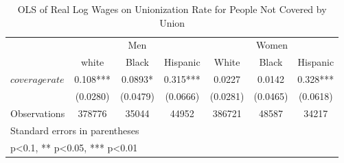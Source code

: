 \begin{table}[htbp]\centering
\def\sym#1{\ifmmode^{#1}\else\(^{#1}\)\fi}
\caption{OLS of Real Log Wages on Unionization Rate for People Not Covered by Union}
\begin{tabular}{l*{6}{c}}
\hline\hline
                    &\multicolumn{3}{c}{Men}                        &\multicolumn{3}{c}{Women}                      \\\cmidrule(lr){2-4}\cmidrule(lr){5-7}
                    &\multicolumn{1}{c}{white}&\multicolumn{1}{c}{Black}&\multicolumn{1}{c}{Hispanic}&\multicolumn{1}{c}{White}&\multicolumn{1}{c}{Black}&\multicolumn{1}{c}{Hispanic}\\
\hline
$ coveragerate $    &       0.108***&      0.0893*  &       0.315***&      0.0227   &      0.0142   &       0.328***\\
                    &    (0.0280)   &    (0.0479)   &    (0.0666)   &    (0.0281)   &    (0.0465)   &    (0.0618)   \\
\hline
Observations        &      378776   &       35044   &       44952   &      386721   &       48587   &       34217   \\
\hline\hline
\multicolumn{7}{l}{\footnotesize Standard errors in parentheses}\\
\multicolumn{7}{l}{\footnotesize * p<0.1, ** p<0.05, *** p<0.01}\\
\end{tabular}
\end{table}
